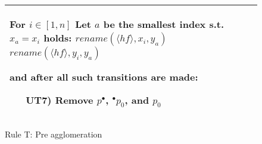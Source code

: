 \begin{figure}[h!]
\begin{adjustbox}{center}
\begin{tabular}{|p{70mm}|p{70mm}|}
\begin{itemize}[leftmargin=10mm]
            For $i\in[1,n]$\newline
            Let $a$ be the smallest index s.t.\ $x_a = x_i$ holds:\newline
            $rename(\langle hf \rangle, x_i, y_a)$\newline
            $rename(\langle hf \rangle, y_i, y_a)$
        \end{itemize}
        and after all such transitions are made:
        \begin{itemize}[leftmargin=10mm]
            \item[UT7)] Remove $p^\bullet$, ${}^\bullet p_0$, and $p_0$
        \end{itemize} \\ \hline
        \end{tabular}
    \end{adjustbox}
    \caption{Rule T: Pre agglomeration}
    \label{fig:rule_t_cpn}
\end{figure}
